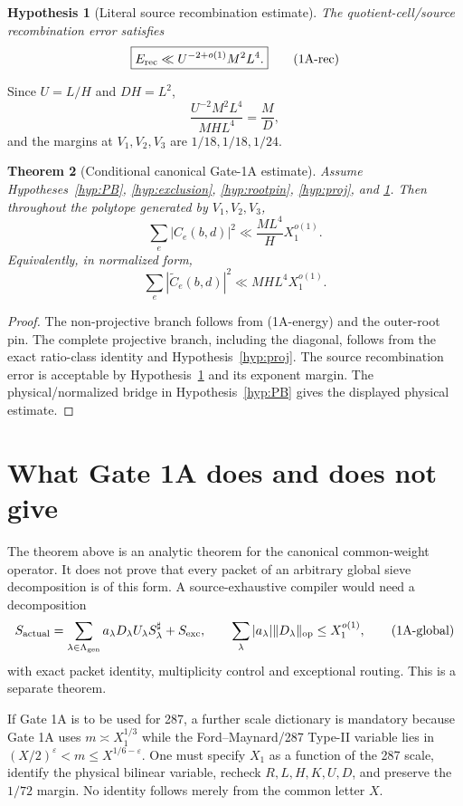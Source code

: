 \documentclass[11pt]{article}
\newtheorem{theorem}{Theorem}[section]
\newtheorem{hypothesis}[theorem]{Hypothesis}
\theoremstyle{definition}
\theoremstyle{remark}
\newcommand{\1}{\mathbf 1}
\begin{document}
\begin{hypothesis}[Literal source recombination estimate]\label{hyp:rec}
The quotient-cell/source recombination error satisfies
\[
 \boxed{E_{\rm rec}\ll U^{-2+o(1)}M^2L^4.}
\tag{1A-rec}
\]
\end{hypothesis}
Since $U=L/H$ and $DH=L^2$,
\[
 \frac{U^{-2}M^2L^4}{MHL^4}=\frac{M}{D},
\]
and the margins at $V_1,V_2,V_3$ are $1/18,1/18,1/24$.

\begin{theorem}[Conditional canonical Gate-1A estimate]\label{thm:G1A}
Assume Hypotheses~\ref{hyp:PB}, \ref{hyp:exclusion}, \ref{hyp:rootpin}, \ref{hyp:proj}, and \ref{hyp:rec}.
Then throughout the polytope generated by $V_1,V_2,V_3$,
\[
 \boxed{\sum_e|C_e(b,d)|^2\ll \frac{ML^4}{H}X_1^{o(1)}.}
\tag{1A-main}
\]
Equivalently, in normalized form,
\[
 \sum_e|\widetilde C_e(b,d)|^2\ll MHL^4X_1^{o(1)}.
\]
\end{theorem}
\begin{proof}
The non-projective branch follows from (1A-energy) and the outer-root pin.  The complete projective branch,
including the diagonal, follows from the exact ratio-class identity and Hypothesis~\ref{hyp:proj}.  The source
recombination error is acceptable by Hypothesis~\ref{hyp:rec} and its exponent margin.  The physical/normalized
bridge in Hypothesis~\ref{hyp:PB} gives the displayed physical estimate.
\end{proof}

\section{What Gate 1A does and does not give}

The theorem above is an analytic theorem for the canonical common-weight operator.  It does not prove that every
packet of an arbitrary global sieve decomposition is of this form.  A source-exhaustive compiler would need a
decomposition
\[
 S_{\rm actual}=\sum_{\lambda\in\Lambda_{\rm gen}}a_\lambda D_\lambda U_\lambda S^\sharp_\lambda+S_{\rm exc},
 \qquad
 \sum_\lambda|a_\lambda|\|D_\lambda\|_{\rm op}\le X_1^{o(1)},
\tag{1A-global}
\]
with exact packet identity, multiplicity control and exceptional routing.  This is a separate theorem.

If Gate 1A is to be used for 287, a further scale dictionary is mandatory because Gate 1A uses
$m\asymp X_1^{1/3}$ while the Ford--Maynard/287 Type-II variable lies in
$(X/2)^\varepsilon<m\le X^{1/6-\varepsilon}$.  One must specify $X_1$ as a function of the 287 scale, identify
the physical bilinear variable, recheck $R,L,H,K,U,D$, and preserve the $1/72$ margin.  No identity follows
merely from the common letter $X$.
\end{document}

